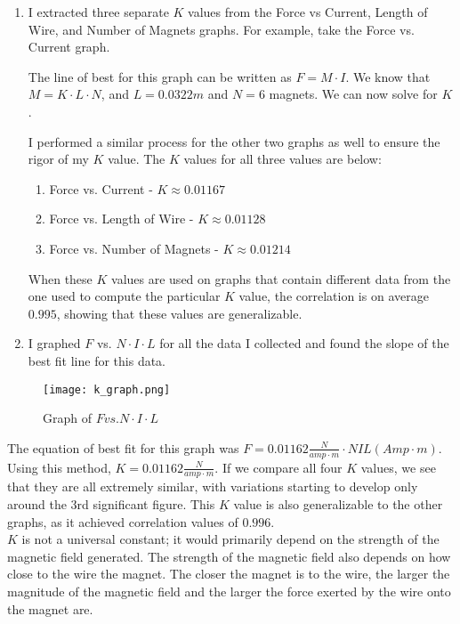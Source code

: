 \documentclass[11pt,twoside]{article}
\begin{document}
\begin{enumerate}
    \item I extracted three separate $K$ values from the Force vs Current, Length of Wire, and Number of Magnets graphs. For example, take the Force vs. Current graph.
    
    The line of best for this graph can be written as $F = M \cdot I$. We know that $M = K \cdot L \cdot N$, and $L = 0.0322 m$ and $N = 6$ magnets. We can now solve for $K$. 
    
    I performed a similar process for the other two graphs as well to ensure the rigor of my $K$ value. The $K$ values for all three values are below:
    
    \begin{enumerate}
        \item Force vs. Current - $K \approx 0.01167$
        \item Force vs. Length of Wire - $K \approx 0.01128$
        \item Force vs. Number of Magnets - $K \approx 0.01214$
    \end{enumerate}
    
    When these $K$ values are used on graphs that contain different data from the one used to compute the particular $K$ value, the correlation is on average $0.995$, showing that these values are generalizable.   
    
    \item I graphed $F$ vs. $N \cdot I \cdot L$ for all the data I collected and found the slope of the best fit line for this data. 
    
\end{enumerate}
\begin{wrapfigure}{l}{0.7\textwidth}
    \centering
    \caption{Graph of $F vs. N \cdot I \cdot L$}
    \texttt{[image: k\_graph.png]}
\end{wrapfigure}

The equation of best fit for this graph was $F = 0.01162 \frac{N}{amp \cdot m} \cdot NIL (Amp \cdot m)$. Using this method, $K = 0.01162 \frac{N}{amp \cdot m}$. If we compare all four $K$ values, we see that they are all extremely similar, with variations starting to develop only around the 3rd significant figure. This $K$ value is also generalizable to the other graphs, as it achieved correlation values of $0.996$. \\

$K$ is not a universal constant; it would primarily depend on the strength of the magnetic field generated. The strength of the magnetic field also depends on how close to the wire the magnet. The closer the magnet is to the wire, the larger the magnitude of the magnetic field and the larger the force exerted by the wire onto the magnet are.
\end{document}
